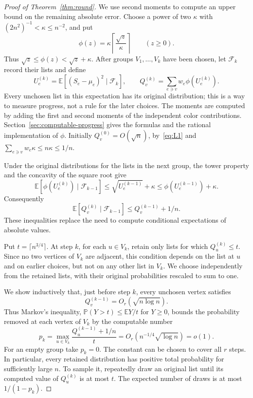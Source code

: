 \documentclass[11pt]{article}
\theoremstyle{definition}\newtheorem{algorithm}{Algorithm}[section]
\numberwithin{equation}{section}
\theoremstyle{remark}\newtheorem*{remark}{Remark}
\newcommand{\E}{\mathbb E}
\newcommand{\Prb}{\mathbb P}
\begin{document}
\begin{proof}[Proof of Theorem~\ref{thm:round}]
We use second moments to compute an upper bound on the remaining
absolute error. Choose a power of two $\kappa$ with $(2n^2)^{-1}<\kappa\le n^{-2}$,
and put
\[
 \phi(z)=\kappa\left\lceil\frac{\sqrt z}{\kappa}\right\rceil
 \qquad(z\ge0).
\]
Thus $\sqrt z\le\phi(z)<\sqrt z+\kappa$. After groups
$V_1,\ldots,V_k$ have been chosen, let $\mathcal F_k$ record their lists
and define
\begin{equation}\label{eq:computable-progress}
 U_e^{(k)}=\E[(S_e-\mu_e)^2\mid\mathcal F_k],\qquad
 Q_v^{(k)}=\sum_{e\ni v}w_e\phi(U_e^{(k)}).
\end{equation}
Every unchosen list in this expectation has its original distribution;
this is a way to measure progress, not a rule for the later choices.
The moments are computed by adding the first and second moments of the
independent color contributions. Section~\ref{sec:computable-progress}
gives the formulas and the rational implementation of $\phi$.
Initially $Q_v^{(0)}=O(\sqrt n)$, by~\eqref{eq:L1} and
$\sum_{e\ni v}w_e\kappa\le n\kappa\le1/n$.

Under the original distributions for the lists in the next group,
the tower property and the concavity of the square root give
\[
 \E[\phi(U_e^{(k)})\mid\mathcal F_{k-1}]
 \le\sqrt{U_e^{(k-1)}}+\kappa
 \le\phi(U_e^{(k-1)})+\kappa.
\]
Consequently
\[
 \E[Q_v^{(k)}\mid\mathcal F_{k-1}]
 \le Q_v^{(k-1)}+1/n.
\]
These inequalities replace the need to compute conditional expectations
of absolute values.

Put $t=\lceil n^{3/4}\rceil$. At step $k$, for each $u\in V_k$, retain only lists
for which $Q_u^{(k)}\le t$. Since no two vertices of $V_k$ are adjacent,
this condition depends on the list at $u$ and on earlier choices, but
not on any other list in $V_k$. We choose independently from the retained
lists, with their original probabilities rescaled to sum to one.

We show inductively that, just before step $k$, every unchosen vertex
satisfies
\[
 Q_v^{(k-1)}=O_r(\sqrt{n\log n}).
\]
Thus Markov's inequality, $\Prb(Y>t)\le\E Y/t$ for $Y\ge0$,
bounds the probability removed at each vertex of $V_k$ by the computable
number
\[
 p_k=\max_{u\in V_k}\frac{Q_u^{(k-1)}+1/n}{t}
     =O_r(n^{-1/4}\sqrt{\log n})=o(1).
\]
For an empty group take $p_k=0$. The constant can be chosen to cover all
$r$ steps. In particular, every retained distribution has positive total
probability for sufficiently large $n$. To sample it, repeatedly draw an
original list until its computed value of $Q_u^{(k)}$ is at most $t$.
The expected number of draws is at most $1/(1-p_k)$.


\end{proof}
\end{document}
